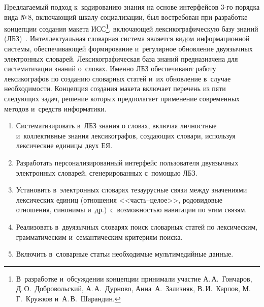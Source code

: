 \begin{multicols}{2}
  Предлагаемый подход к~кодированию знания на основе интерфейсов 3-го 
порядка вида №\,8, включающий шкалу социализации, был востребован при 
разработке концепции создания макета ИСС\footnote{В~разработке 
и~обсуждении концепции принимали участие  А.\,А.~Гончаров, 
Д.\,О.~Добровольский, А.\,А.~Дурново,  Анна~А.~Зализняк, В.\,И.~Карпов, М.\,Г.~Кружков 
и~А.\,В.~Шарандин.}, включающей лексикографическую базу знаний 
(ЛБЗ)~\cite{31-zac}. Интеллектуальная словарная сис\-те\-ма  является видом информационной системы, 
обеспечивающей формирование и~регулярное обновление двуязычных 
электронных словарей. Лексикографическая база знаний предназначена для систематизации знаний 
о~словах. Именно ЛБЗ обеспечивают работу лексикографов по созданию 
словарных статей и~их обновление в~случае необходимости. Концепция 
создания макета включает перечень из пяти следующих задач, решение 
которых предполагает применение современных методов и~средств 
информатики.
  \begin{enumerate}[1.]
  \item  Систематизировать в~ЛБЗ знания о словах, включая личностные 
и~коллективные знания лексикографов, создающих словари, используя 
лексические единицы двух ЕЯ.
  \item Разработать персонализированный интерфейс пользователя двуязычных 
электронных словарей, сгенерированных с~помощью ЛБЗ. 
  \item Установить в~электронных словарях тезаурусные связи между 
значениями лексических единиц (отношения <<часть--це\-лое>>, родовидовые 
отношения, синонимы и~др.)\ с~возможностью навигации по этим связям.
  \item Реализовать в~двуязычных словарях поиск словарных статей по 
лексическим, грамматическим и~семантическим критериям поиска.
  \item Включить в~словарные статьи необходимые мультимедийные данные.
  \end{enumerate}
  

\end{multicols}
